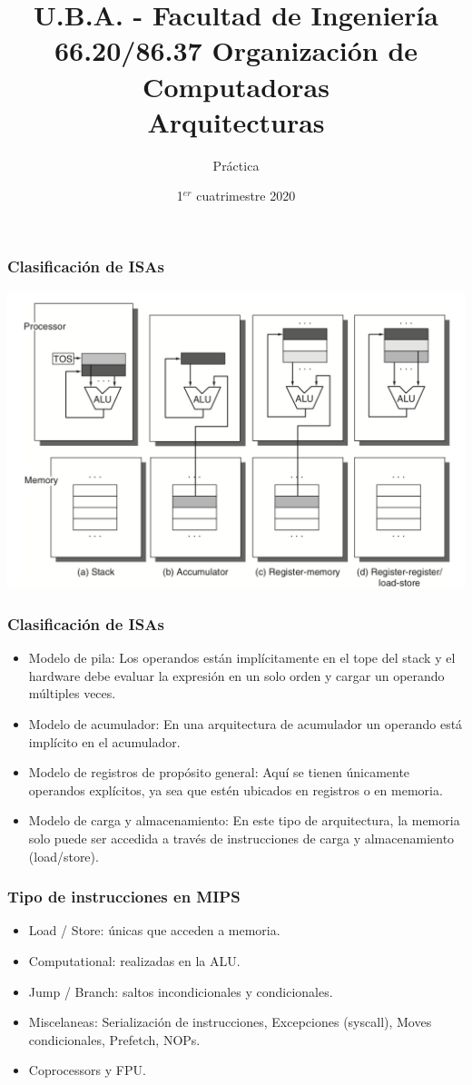 \documentclass{beamer}
\title[66.20/86.37]{U.B.A. - Facultad de Ingeniería\\\vspace{0.25cm} 66.20/86.37 Organización de Computadoras
\\Arquitecturas}
\author{Práctica}
\date{1$^{er}$ cuatrimestre 2020}
\begin{document}
\begin{frame}
\titlepage %
\end{frame}

\begin{frame}
\frametitle{Clasificación de ISAs}
\begin{center}
 \includegraphics[scale=.45,keepaspectratio=true]{ISA.png}
\end{center}
\end{frame}

\begin{frame}
 \frametitle{Clasificación de ISAs}
 \begin{itemize}
  \item Modelo de pila: 
Los operandos están implícitamente en el tope del stack y el hardware debe evaluar la expresión en un solo orden y cargar un operando múltiples veces.
\item Modelo de acumulador: 
En una arquitectura de acumulador un operando está implícito en el acumulador.
\item Modelo de registros de propósito general: 
Aquí se tienen únicamente operandos explícitos, ya sea que estén ubicados en registros o en memoria.
\item Modelo de carga y almacenamiento: 
En este tipo de arquitectura, la memoria solo puede ser accedida a través de instrucciones de carga y almacenamiento (load/store). 
 \end{itemize}
\end{frame}


\begin{frame}
 \frametitle{Tipo de instrucciones en MIPS}
 \begin{itemize}
  \item Load / Store: únicas que acceden a memoria.
  \item Computational: realizadas en la ALU.
  \item Jump / Branch: saltos incondicionales y condicionales.
  \item Miscelaneas: Serialización de instrucciones, Excepciones (syscall), Moves condicionales, Prefetch, NOPs.
  \item Coprocessors y FPU.
 \end{itemize}
\end{frame}
\end{document}
